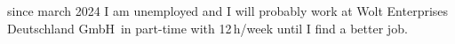 \versionLanguageStart%
		since march 2024 I am unemployed and I will probably work at \glqq Wolt Enterprises Deutschland GmbH\grqq\ in part-time with 12\,h/week until I find a better job.
\versionLanguageEnd